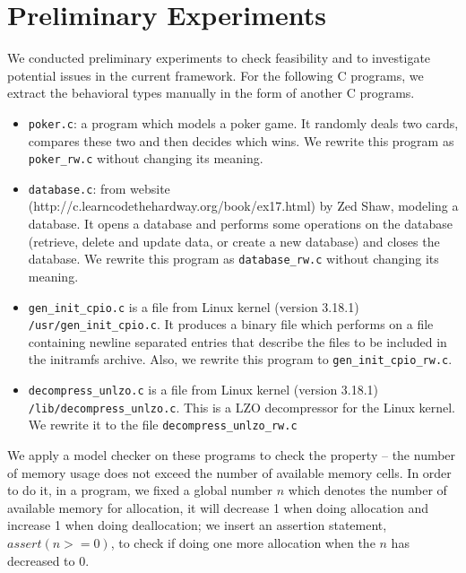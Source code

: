 \section{Preliminary Experiments}
\label{sec:experiment}


We conducted preliminary experiments to check feasibility and to
investigate potential issues in the current framework.  For the
following C programs, we extract the behavioral types manually in the
form of another C programs.
\begin{itemize}

\item \texttt{poker.c}: a program which models a poker game.  It
  randomly deals two cards, compares these two and then decides which
  wins.  We rewrite this program as \texttt{poker\_rw.c} without
  changing its meaning.
\item \texttt{database.c}: from website
  (http://c.learncodethehardway.org/book/ex17.html) by Zed Shaw,
  modeling a database.  It opens a database and performs some
  operations on the database (retrieve, delete and update data, or
  create a new database) and closes the database.  We rewrite this
  program as \texttt{database\_rw.c} without changing its meaning.
\item \texttt{gen\_init\_cpio.c} is a file from Linux kernel (version 3.18.1)
  \texttt{/usr/gen\_init\_cpio.c}.  It produces a binary file which
  performs on a file containing newline separated entries that
  describe the files to be included in the initramfs archive.  Also, we
  rewrite this program to \texttt{gen\_init\_cpio\_rw.c}.
  \item \texttt{decompress\_unlzo.c} is a file from Linux kernel (version 3.18.1)
    \texttt{/lib/decompress\_unlzo.c}.  This is a LZO decompressor for
    the Linux kernel.  We rewrite it to the file \texttt{decompress\_unlzo\_rw.c}
\end{itemize}

We apply a model checker on these programs to check the property --
the number of memory usage does not exceed the number of available
memory cells.  In order to do it, in a program, we fixed a global
number $n$ which denotes the number of available memory for
allocation, it will decrease 1 when doing allocation and increase 1
when doing deallocation; we insert an assertion statement, $assert(n
>= 0)$, to check if doing one more allocation when the $n$ has
decreased to $0$.

